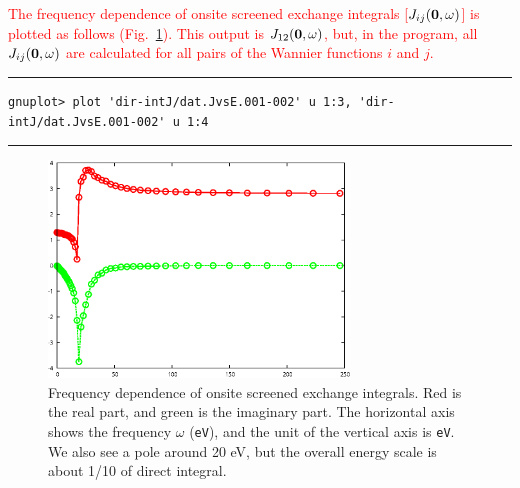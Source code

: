 \documentclass{article}
\newcommand{\tr}[1]{\textcolor{red}{#1}}
\begin{document}
\tr{The frequency dependence of onsite screened exchange integrals [$J_ {ij}({\bf 0},\omega)$] is plotted as follows (Fig.~\ref{JvsE}). This output is $J_{12}({\bf 0},\omega)$, but, in the program, all $J_{ij}({\bf 0},\omega)$ are calculated for all pairs of the Wannier functions $i$ and $j$.}  
\vspace{5mm}\hrule
\begin{verbatim}
gnuplot> plot 'dir-intJ/dat.JvsE.001-002' u 1:3, 'dir-intJ/dat.JvsE.001-002' u 1:4  
\end{verbatim}
\hrule\vspace{5mm}
\begin{figure}[H] 
\centering
\includegraphics[width=8cm]{JvsE-Al.eps}
\caption{Frequency dependence of onsite screened exchange integrals. Red is the real part, and green is the imaginary part. The horizontal axis shows the frequency $\omega$ ({\tt eV}), and the unit of the vertical axis is {\tt eV}. We also see a pole around 20 eV, but the overall energy scale is about 1/10 of direct integral.}
\label{JvsE}
\end{figure}

\clearpage 
\end{document}
